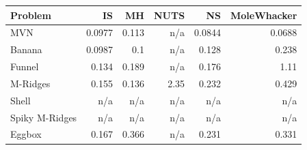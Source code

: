 \begin{tabular}{lrrrrr}
\toprule
Problem & IS & MH & NUTS & NS & MoleWhacker \\
\midrule
MVN & 0.0977 & 0.113 & n/a & 0.0844 & 0.0688 \\
Banana & 0.0987 & 0.1 & n/a & 0.128 & 0.238 \\
Funnel & 0.134 & 0.189 & n/a & 0.176 & 1.11 \\
M-Ridges & 0.155 & 0.136 & 2.35 & 0.232 & 0.429 \\
Shell & n/a & n/a & n/a & n/a & n/a \\
Spiky M-Ridges & n/a & n/a & n/a & n/a & n/a \\
\midrule
Eggbox & 0.167 & 0.366 & n/a & 0.231 & 0.331 \\
\bottomrule
\end{tabular}

